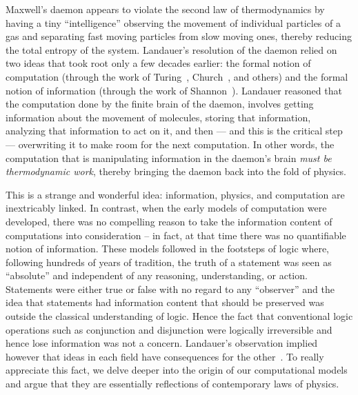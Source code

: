 \documentclass{article}
\begin{document}
Maxwell's daemon appears to violate the second law of thermodynamics by
having a tiny ``intelligence'' observing the movement of individual
particles of a gas and separating fast moving particles from slow
moving ones, thereby reducing the total entropy of the
system. Landauer's resolution of the daemon relied on two ideas that
took root only a few decades earlier: the formal notion of computation
(through the work of Turing~\cite{turing}, Church~\cite{church51}, and
others) and the formal notion of information (through the work of
Shannon~\cite{shannon1948}). Landauer reasoned that the computation
done by the finite brain of the daemon, involves getting information
about the movement of molecules, storing that information, analyzing
that information to act on it, and then --- and this is the critical
step --- overwriting it to make room for the next computation.  In
other words, the computation that is manipulating information in the
daemon's brain \textit{must be thermodynamic work}, thereby bringing
the daemon back into the fold of physics.

This is a strange and wonderful idea: information, physics, and
computation are inextricably linked. In contrast, when the early
models of computation were developed, there was no compelling reason
to take the information content of computations into consideration
-- in fact, at that time there was no quantifiable notion of
information. These models followed in the footsteps of logic where,
following hundreds of years of tradition, the truth of a statement was
seen as ``absolute'' and independent of any reasoning, understanding,
or action. Statements were either true or false with no regard to any
``observer'' and the idea that statements had information content that
should be preserved was outside the classical understanding of
logic. Hence the fact that conventional logic operations such as
conjunction and disjunction were logically irreversible and hence lose
information was not a concern. Landauer's observation implied however
that ideas in each field have consequences for the
other~\cite{bennett:1973:lrc,bennett1985fundamental,bennett2010notes,bennett2003notes,baker:1992:nft,baez2011physics,dblp:conf/csfw/malacarias12}. To
really appreciate this fact, we delve deeper into the origin of our
computational models and argue that they are essentially reflections
of contemporary laws of physics.

\end{document}
